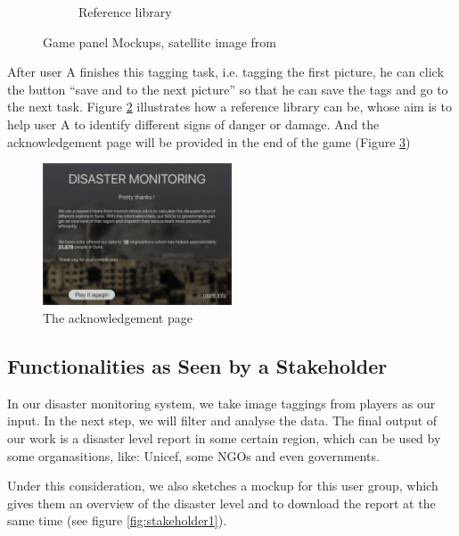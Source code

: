 \begin{figure}[H]
\begin{subfigure}[b]{0.45\textwidth}
        \caption{Reference library}
        \label{fig:player3}
    \end{subfigure}
    \caption{Game panel Mockups, satellite image from  \cite{satellite-photo-1}}
\end{figure}

After user A finishes this tagging task,
i.e.
tagging the first picture,
he can click the button ``save and to the next picture'' so that he can save the tags and go to the next task.
Figure \ref{fig:player3} illustrates how a reference library can be,
whose aim is to help user A to identify different signs of danger or damage. And the acknowledgement page will be provided in the end of the game (Figure \ref{fig:player4})

\begin{figure}[H]
\centering
\includegraphics[width=0.5\textwidth]{figures/function-player-4}
\caption{The acknowledgement page}
\label{fig:player4}
\end{figure}

\subsection{Functionalities as Seen by a Stakeholder}
In our disaster monitoring system, 
we take image taggings from players as our input. 
In the next step, 
we will filter and analyse the data.
The final output of our work is a disaster level report in some certain region,
which can be used by some organasitions,
like: Unicef, some NGOs and even governments.

Under this consideration, 
we also sketches a mockup for this user group,
which gives them an overview of the disaster level and 
to download the report at the same time (see figure \ref{fig:stakeholder1}).

